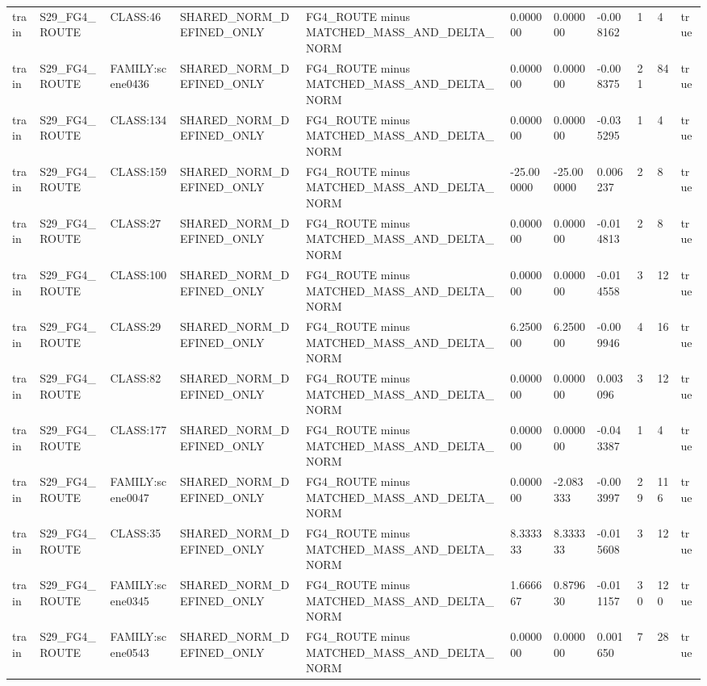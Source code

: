 \begin{tabular}{lllllllllll}
train & S29\_FG4\_ROUTE & CLASS:46 & SHARED\_NORM\_DEFINED\_ONLY & FG4\_ROUTE minus MATCHED\_MASS\_AND\_DELTA\_NORM & 0.000000 & 0.000000 & -0.008162 & 1 & 4 & true \\
train & S29\_FG4\_ROUTE & FAMILY:scene0436 & SHARED\_NORM\_DEFINED\_ONLY & FG4\_ROUTE minus MATCHED\_MASS\_AND\_DELTA\_NORM & 0.000000 & 0.000000 & -0.008375 & 21 & 84 & true \\
train & S29\_FG4\_ROUTE & CLASS:134 & SHARED\_NORM\_DEFINED\_ONLY & FG4\_ROUTE minus MATCHED\_MASS\_AND\_DELTA\_NORM & 0.000000 & 0.000000 & -0.035295 & 1 & 4 & true \\
train & S29\_FG4\_ROUTE & CLASS:159 & SHARED\_NORM\_DEFINED\_ONLY & FG4\_ROUTE minus MATCHED\_MASS\_AND\_DELTA\_NORM & -25.000000 & -25.000000 & 0.006237 & 2 & 8 & true \\
train & S29\_FG4\_ROUTE & CLASS:27 & SHARED\_NORM\_DEFINED\_ONLY & FG4\_ROUTE minus MATCHED\_MASS\_AND\_DELTA\_NORM & 0.000000 & 0.000000 & -0.014813 & 2 & 8 & true \\
train & S29\_FG4\_ROUTE & CLASS:100 & SHARED\_NORM\_DEFINED\_ONLY & FG4\_ROUTE minus MATCHED\_MASS\_AND\_DELTA\_NORM & 0.000000 & 0.000000 & -0.014558 & 3 & 12 & true \\
train & S29\_FG4\_ROUTE & CLASS:29 & SHARED\_NORM\_DEFINED\_ONLY & FG4\_ROUTE minus MATCHED\_MASS\_AND\_DELTA\_NORM & 6.250000 & 6.250000 & -0.009946 & 4 & 16 & true \\
train & S29\_FG4\_ROUTE & CLASS:82 & SHARED\_NORM\_DEFINED\_ONLY & FG4\_ROUTE minus MATCHED\_MASS\_AND\_DELTA\_NORM & 0.000000 & 0.000000 & 0.003096 & 3 & 12 & true \\
train & S29\_FG4\_ROUTE & CLASS:177 & SHARED\_NORM\_DEFINED\_ONLY & FG4\_ROUTE minus MATCHED\_MASS\_AND\_DELTA\_NORM & 0.000000 & 0.000000 & -0.043387 & 1 & 4 & true \\
train & S29\_FG4\_ROUTE & FAMILY:scene0047 & SHARED\_NORM\_DEFINED\_ONLY & FG4\_ROUTE minus MATCHED\_MASS\_AND\_DELTA\_NORM & 0.000000 & -2.083333 & -0.003997 & 29 & 116 & true \\
train & S29\_FG4\_ROUTE & CLASS:35 & SHARED\_NORM\_DEFINED\_ONLY & FG4\_ROUTE minus MATCHED\_MASS\_AND\_DELTA\_NORM & 8.333333 & 8.333333 & -0.015608 & 3 & 12 & true \\
train & S29\_FG4\_ROUTE & FAMILY:scene0345 & SHARED\_NORM\_DEFINED\_ONLY & FG4\_ROUTE minus MATCHED\_MASS\_AND\_DELTA\_NORM & 1.666667 & 0.879630 & -0.011157 & 30 & 120 & true \\
train & S29\_FG4\_ROUTE & FAMILY:scene0543 & SHARED\_NORM\_DEFINED\_ONLY & FG4\_ROUTE minus MATCHED\_MASS\_AND\_DELTA\_NORM & 0.000000 & 0.000000 & 0.001650 & 7 & 28 & true \\

\end{tabular}
